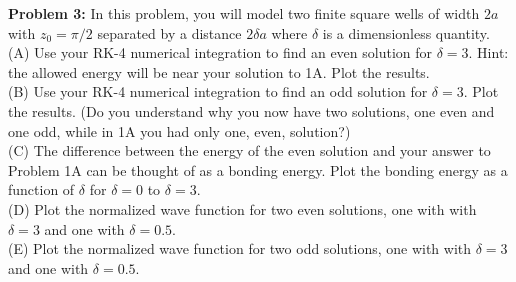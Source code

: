 \documentclass[12pt]{article}
\begin{document}
\noindent
{\bf Problem 3:}  In this problem, you will model two finite square wells of width $2a$ with $z_0=\pi/2$ separated by a distance $2 \delta a$ where $\delta$ is a dimensionless quantity.\\[5pt]

\noindent
(A) Use your RK-4 numerical integration to find an even solution for $\delta=3$.  Hint: the allowed energy will be near your solution to 1A.  Plot the results.\\[5pt]

\noindent
(B) Use your RK-4 numerical integration to find an odd solution for
$\delta=3$. Plot the results.  (Do you understand why you now have two
solutions, one even and one odd, while in 1A you had only one, even,
solution?)\\[5pt]

\noindent
(C) The difference between the energy of the even solution and your answer to Problem 1A can be thought of as a bonding energy.  Plot the bonding energy as a function of $\delta$ for $\delta=0$ to $\delta=3$.\\[5pt]

\noindent
(D) Plot the normalized wave function for two even solutions, one with with $\delta=3$ and one with $\delta=0.5$.\\[5pt] 

\noindent
(E) Plot the normalized wave function for two odd solutions, one with with $\delta=3$ and one with $\delta=0.5$.  
\end{document}
